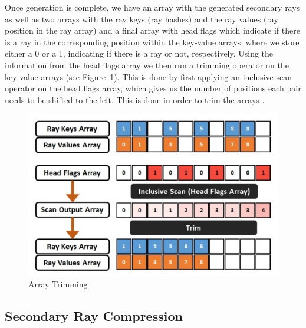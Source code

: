 Once generation is complete, we have an array with the generated secondary rays as well as two arrays with the ray keys (ray hashes) and the ray values (ray position in the ray array) and a final array with head flags which indicate if there is a ray in the corresponding position within the key-value arrays, where we store either a 0 or a 1, indicating if there is a ray or not, respectively.
Using the information from the head flags array we then run a trimming operator on the key-value arrays (see Figure~\ref{fig:at}). This is done by first applying an inclusive scan operator \cite{Merrill09} on the head flags array, which gives us the number of positions each pair needs to be shifted to the left. This is done in order to trim the arrays \cite{GPUGems2}.

\begin{figure}[!htb]
    \centering
    \includegraphics[scale=0.75]{Images/Array_Trimming}
    \caption{\label{fig:at}Array Trimming}
\end{figure}

\subsection{Secondary Ray Compression}

